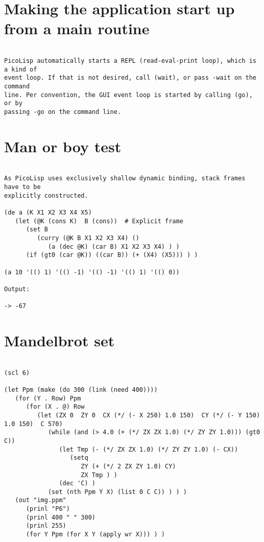 \section*{Making the application start up from a main routine}

\begin{verbatim}

PicoLisp automatically starts a REPL (read-eval-print loop), which is a kind of
event loop. If that is not desired, call (wait), or pass -wait on the command
line. Per convention, the GUI event loop is started by calling (go), or by
passing -go on the command line.

\end{verbatim}

\section*{Man or boy test}

\begin{verbatim}

As PicoLisp uses exclusively shallow dynamic binding, stack frames have to be
explicitly constructed.

(de a (K X1 X2 X3 X4 X5)
   (let (@K (cons K)  B (cons))  # Explicit frame
      (set B
         (curry (@K B X1 X2 X3 X4) ()
            (a (dec @K) (car B) X1 X2 X3 X4) ) )
      (if (gt0 (car @K)) ((car B)) (+ (X4) (X5))) ) )

(a 10 '(() 1) '(() -1) '(() -1) '(() 1) '(() 0))

Output:

-> -67

\end{verbatim}

\section*{Mandelbrot set}

\begin{verbatim}

(scl 6)

(let Ppm (make (do 300 (link (need 400))))
   (for (Y . Row) Ppm
      (for (X . @) Row
         (let (ZX 0  ZY 0  CX (*/ (- X 250) 1.0 150)  CY (*/ (- Y 150) 1.0 150)  C 570)
            (while (and (> 4.0 (+ (*/ ZX ZX 1.0) (*/ ZY ZY 1.0))) (gt0 C))
               (let Tmp (- (*/ ZX ZX 1.0) (*/ ZY ZY 1.0) (- CX))
                  (setq
                     ZY (+ (*/ 2 ZX ZY 1.0) CY)
                     ZX Tmp ) )
               (dec 'C) )
            (set (nth Ppm Y X) (list 0 C C)) ) ) )
   (out "img.ppm"
      (prinl "P6")
      (prinl 400 " " 300)
      (prinl 255)
      (for Y Ppm (for X Y (apply wr X))) ) )

\end{verbatim}


